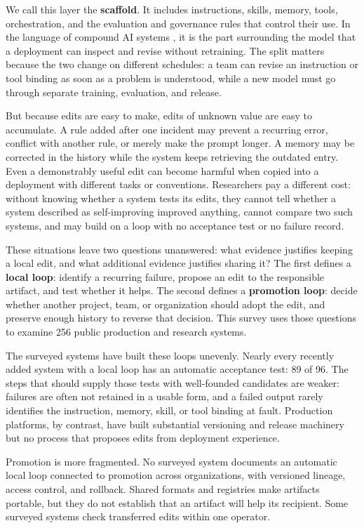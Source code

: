 \documentclass[
  11pt,
]{article}
\begin{document}
We call this layer the \textbf{scaffold}. It includes instructions, skills, memory, tools, orchestration, and the evaluation and governance rules that control their use. In the language of compound AI systems \cite{zaharia2024compound}, it is the part surrounding the model that a deployment can inspect and revise without retraining. The split matters because the two change on different schedules: a team can revise an instruction or tool binding as soon as a problem is understood, while a new model must go through separate training, evaluation, and release.

But because edits are easy to make, edits of unknown value are easy to accumulate. A rule added after one incident may prevent a recurring error, conflict with another rule, or merely make the prompt longer. A memory may be corrected in the history while the system keeps retrieving the outdated entry. Even a demonstrably useful edit can become harmful when copied into a deployment with different tasks or conventions. Researchers pay a different cost: without knowing whether a system tests its edits, they cannot tell whether a system described as self-improving improved anything, cannot compare two such systems, and may build on a loop with no acceptance test or no failure record.

These situations leave two questions unanswered: what evidence justifies keeping a local edit, and what additional evidence justifies sharing it? The first defines a \textbf{local loop}: identify a recurring failure, propose an edit to the responsible artifact, and test whether it helps. The second defines a \textbf{promotion loop}: decide whether another project, team, or organization should adopt the edit, and preserve enough history to reverse that decision. This survey uses those questions to examine 256 public production and research systems.

The surveyed systems have built these loops unevenly. Nearly every recently added system with a local loop has an automatic acceptance test: 89 of 96. The steps that should supply those tests with well-founded candidates are weaker: failures are often not retained in a usable form, and a failed output rarely identifies the instruction, memory, skill, or tool binding at fault. Production platforms, by contrast, have built substantial versioning and release machinery but no process that proposes edits from deployment experience.

Promotion is more fragmented. No surveyed system documents an automatic local loop connected to promotion across organizations, with versioned lineage, access control, and rollback. Shared formats and registries make artifacts portable, but they do not establish that an artifact will help its recipient. Some surveyed systems check transferred edits within one operator.
\end{document}
